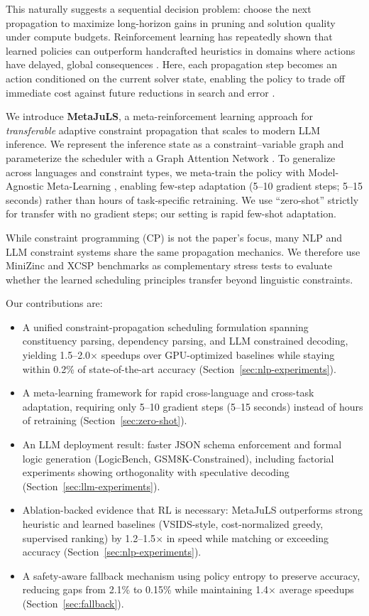 \documentclass[11pt]{article}
\begin{document}
This naturally suggests a sequential decision problem: choose the next propagation to maximize long-horizon gains in pruning and solution quality under compute budgets. Reinforcement learning has repeatedly shown that learned policies can outperform handcrafted heuristics in domains where actions have delayed, global consequences \citep{mnih2015human,silver2016alphago,silver2017alphago,lillicrap2015continuous,watkins1992q,williams1992simple}. Here, each propagation step becomes an action conditioned on the current solver state, enabling the policy to trade off immediate cost against future reductions in search and error \citep{rumelhart1986learning,lecun1998gradient,hochreiter1997long}.

We introduce \textbf{MetaJuLS}, a meta-reinforcement learning approach for \emph{transferable} adaptive constraint propagation that scales to modern LLM inference. We represent the inference state as a constraint--variable graph and parameterize the scheduler with a Graph Attention Network \citep{velickovic2018graph}. To generalize across languages and constraint types, we meta-train the policy with Model-Agnostic Meta-Learning \citep{finn2017model}, enabling few-step adaptation (5--10 gradient steps; 5--15 seconds) rather than hours of task-specific retraining. We use ``zero-shot'' strictly for transfer with no gradient steps; our setting is rapid few-shot adaptation.

While constraint programming (CP) is not the paper's focus, many NLP and LLM constraint systems share the same propagation mechanics. We therefore use MiniZinc and XCSP benchmarks as complementary stress tests to evaluate whether the learned scheduling principles transfer beyond linguistic constraints.

Our contributions are:
\begin{itemize}
\item A unified constraint-propagation scheduling formulation spanning constituency parsing, dependency parsing, and LLM constrained decoding, yielding 1.5--2.0$\times$ speedups over GPU-optimized baselines while staying within 0.2\% of state-of-the-art accuracy (Section~\ref{sec:nlp-experiments}).
\item A meta-learning framework for rapid cross-language and cross-task adaptation, requiring only 5--10 gradient steps (5--15 seconds) instead of hours of retraining (Section~\ref{sec:zero-shot}).
\item An LLM deployment result: faster JSON schema enforcement and formal logic generation (LogicBench, GSM8K-Constrained), including factorial experiments showing orthogonality with speculative decoding (Section~\ref{sec:llm-experiments}).
\item Ablation-backed evidence that RL is necessary: MetaJuLS outperforms strong heuristic and learned baselines (VSIDS-style, cost-normalized greedy, supervised ranking) by 1.2--1.5$\times$ in speed while matching or exceeding accuracy (Section~\ref{sec:nlp-experiments}).
\item A safety-aware fallback mechanism using policy entropy to preserve accuracy, reducing gaps from 2.1\% to 0.15\% while maintaining 1.4$\times$ average speedups (Section~\ref{sec:fallback}).
\end{itemize}
\end{document}
